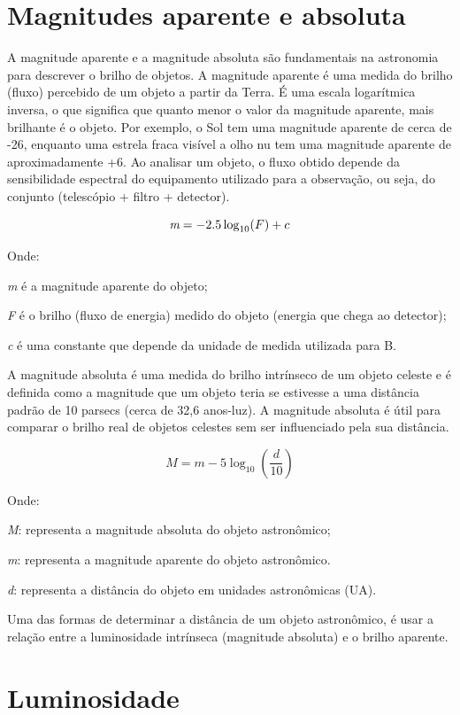 \section{Magnitudes aparente e absoluta}

A magnitude aparente e a magnitude absoluta são fundamentais na astronomia para descrever o brilho de objetos. A magnitude aparente é uma medida do brilho (fluxo) percebido de um objeto a partir da Terra. É uma escala logarítmica inversa, o que significa que quanto menor o valor da magnitude aparente, mais brilhante é o objeto. Por exemplo, o Sol tem uma magnitude aparente de cerca de -26, enquanto uma estrela fraca visível a olho nu tem uma magnitude aparente de aproximadamente +6. Ao analisar um objeto, o fluxo obtido depende da sensibilidade espectral do equipamento utilizado para a observação, ou seja, do conjunto (telescópio + filtro + detector).

\[ \emph{m} = -2.5 \log_{10}(F) + c \]

Onde:

\emph{m} é a magnitude aparente do objeto;

\emph{F} é o brilho (fluxo de energia) medido do objeto (energia que chega ao detector);

\emph{c} é uma constante que depende da unidade de medida utilizada para B.

A magnitude absoluta é uma medida do brilho intrínseco de um objeto celeste e é definida como a magnitude que um objeto teria se estivesse a uma distância padrão de 10 parsecs (cerca de 32,6 anos-luz). A magnitude absoluta é útil para comparar o brilho real de objetos celestes sem ser influenciado pela sua distância.

\[ M = m - 5 \log_{10}(\frac{d}{10}) \]

Onde:

\emph{M}: representa a magnitude absoluta do objeto astronômico;

\emph{m}: representa a magnitude aparente do objeto astronômico.

\emph{d}: representa a distância do objeto em unidades astronômicas (UA).

Uma das formas de determinar a distância de um objeto astronômico, é usar a relação entre a luminosidade intrínseca (magnitude absoluta) e o brilho aparente. 

\section{Luminosidade}

